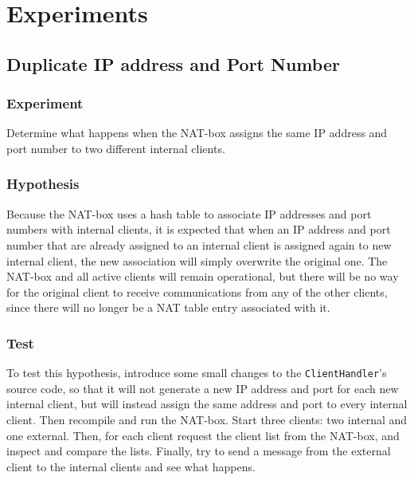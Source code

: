 \documentclass[10pt, a4paper]{article}
\begin{document}

\section{Experiments}
\label{sec:exp}


\subsection{Duplicate IP address and Port Number}
\label{ssec:dup}


\subsubsection{Experiment}
\label{sssec:dupexp}

Determine what happens when the NAT-box assigns the same IP address and port
number to two different internal clients.


\subsubsection{Hypothesis}
\label{sssec:duphyp}

Because the NAT-box uses a hash table to associate IP addresses and port numbers
with internal clients, it is expected that when an IP address and port number
that are already assigned to an internal client is assigned again to new
internal client, the new association will simply overwrite the original one. The
NAT-box and all active clients will remain operational, but there will be no way
for the original client to receive communications from any of the other clients,
since there will no longer be a NAT table entry associated with it.


\subsubsection{Test}
\label{sssec:duptest}

To test this hypothesis, introduce some small changes to the
\texttt{ClientHandler}'s source code, so that it will not generate a new IP
address and port for each new internal client, but will instead assign the same
address and port to every internal client. Then recompile and run the NAT-box.
Start three clients: two internal and one external. Then, for each client
request the client list from the NAT-box, and inspect and compare the lists.
Finally, try to send a message from the external client to the internal clients
and see what happens.
\end{document}
